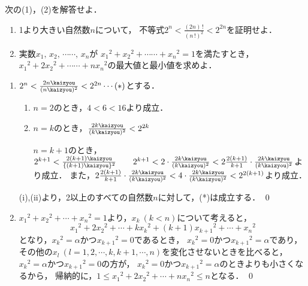 \begin{problem}
  次の(1)，(2)を解答せよ．
\begin{enumerate}
\item 1より大きい自然数$n$について，
不等式$\displaystyle 2^n<\frac{(2n) \, !}{{(n \, !)}^2}<2^{2n}$を証明せよ．
\item 実数$x_1, \, x_2, \, \cdots\cdots, \, x_n$が
${x_1}^2+{x_2}^2+\cdots\cdots+{x_n}^2=1$を満たすとき，
${x_1}^2+2{x_2}^2+\cdots\cdots+n{x_n}^2$の最大値と最小値を求めよ．
\end{enumerate}
\end{problem}

\begin{enumerate}
  \item $2^n < \frac{{2n}\kaizyou}{({n}\kaizyou)^2} < 2^{2n} \cdots (*)$とする．
  \begin{enumerate}
    \item $n=2$のとき，$4<6<16$より成立．
    \item $n=k$のとき，$\frac{{2k}\kaizyou}{({k}\kaizyou)^2} < 2^{2k}$

    $n=k+1$のとき，$2^{k+1} < \frac{2{(k+1)}\kaizyou}{\{{(k+1)}\kaizyou\}^2} \qquad 2^{k+1}<2\cdot\frac{2{k}\kaizyou}{(k\kaizyou)^2}<2\frac{2(k+1)}{k+1} \cdot \frac{2{k}\kaizyou}{({k}\kaizyou)^2}$より成立．
    また，$2\frac{2(k+1)}{k+1} \cdot \frac{2{k}\kaizyou}{({k}\kaizyou)^2}
    < 4\cdot\frac{2{k}\kaizyou}{({k}\kaizyou)^2} < 2^{2(k+1)}$より成立．
  \end{enumerate}
  (i),(ii)より，2以上のすべての自然数$n$に対して，(*)は成立する． \qed

  \item ${x_1}^2 + {x_2}^2 + \cdots + {x_n}^2 = 1$より，$x_k\ (k<n)$について考えると，
  \[{x_1}^2 + 2{x_2}^2 + \cdots + k{x_k}^2 + (k+1){x_{k+1}}^2 + \cdots + {x_n}^2\]
  となり，${x_k}^2 = \alpha$かつ${x_{k+1}}^2 = 0$であるとき，
  ${x_k}^2 = 0$かつ${x_{k+1}}^2 = \alpha$であり，
  その他の$x_l\ (l=1,2,\cdots,k,k+1,\cdots,n)$を変化させないときを比べると，
  ${x_k}^2 =\alpha$かつ${x_{k+1}}^2 = 0$の方が，
  ${x_k}^2 = 0$かつ${x_{k+1}}^2 = \alpha$のときよりも小さくなるから，
  帰納的に，$1 \leq {x_1}^2 + 2{x_2}^2 + \cdots + n{x_n}^2 \leq n$となる．
  \qed
\end{enumerate}
